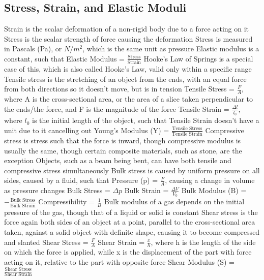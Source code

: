 \documentclass[11 pt, twoside]{article}
\newenvironment{outline*}
{
	\begin{outline}[enumerate]
	}
	{\end{outline}
}
\begin{document}
\subsection{Stress, Strain, and Elastic Moduli}
\begin{outline*}
\1 Strain is the scalar deformation of a non-rigid body due to a force acting on it
\1 Stress is the scalar strength of force causing the deformation
\2 Stress is measured in Pascals (Pa), or $N/m^2$, which is the same unit as pressure
\1 Elastic modulus is a constant, such that Elastic Modulus = $\frac{\text{Stress}}{\text{Strain}}$
\2 Hooke’s Law of Springs is a special case of this, which is also called Hooke’s Law, valid only within a specific range
\1 Tensile stress is the stretching of an object from the ends, with an equal force from both directions so it doesn’t move, but is in tension
\2 Tensile Stress = $\frac{F}{A}$, where A is the cross-sectional area, or the area of a slice taken perpendicular to the ends/the force, and F is the magnitude of the force
\2 Tensile Strain = $\frac{\Delta l}{l_0}$, where $l_0$ is the initial length of the object, such that Tensile Strain doesn’t have a unit due to it cancelling out
\2 Young’s Modulus (Y) = $\frac{\text{Tensile Stress}}{\text{Tensile Strain}}$
\2 Compressive stress is stress such that the force is inward, though compressive modulus is usually the same, though certain composite materials, such as stone, are the exception
\2 Objects, such as a beam being bent, can have both tensile and compressive stress simultaneously
\1 Bulk stress is caused by uniform pressure on all sides, caused by a fluid, such that Pressure (p) = $\frac{F}{A}$, causing a change in volume as pressure changes
\2 Bulk Stress = $\Delta p$
\2 Bulk Strain = $\frac{\Delta V}{V_0}$
\2 Bulk Modulus (B) = $-\frac{\text{Bulk Stress}}{\text{Bulk Strain}}$
\2 Compressibility = $\frac{1}{B}$
\2 Bulk modulus of a gas depends on the initial pressure of the gas, though that of a liquid or solid is constant
\1 Shear stress is the force again both sides of an object at a point, parallel to the cross-sectional area taken, against a solid object with definite shape, causing it to become compressed and slanted
\2 Shear Stress = $\frac{F}{A}$
\2 Shear Strain = $\frac{x}{h}$, where h is the length of the side on which the force is applied, while x is the displacement of the part with force acting on it, relative to the part with opposite force
\2 Shear Modulus (S) = $\frac{\text{Shear Stress}}{\text{Shear Strain}}$
\end{outline*}
\end{document}
